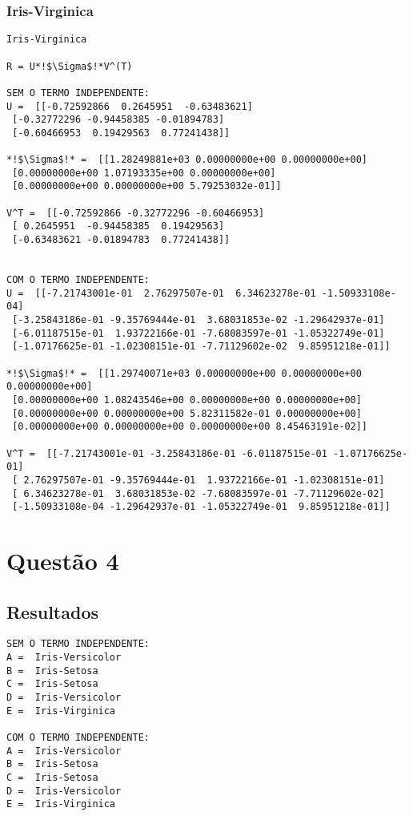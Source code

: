 \documentclass[a4paper,12pt,twoside]{article}
\begin{document}
\subsubsection{Iris-Virginica}
\begin{lstlisting}
Iris-Virginica

R = U*!$\Sigma$!*V^(T)

SEM O TERMO INDEPENDENTE: 
U =  [[-0.72592866  0.2645951  -0.63483621]
 [-0.32772296 -0.94458385 -0.01894783]
 [-0.60466953  0.19429563  0.77241438]]

*!$\Sigma$!* =  [[1.28249881e+03 0.00000000e+00 0.00000000e+00]
 [0.00000000e+00 1.07193335e+00 0.00000000e+00]
 [0.00000000e+00 0.00000000e+00 5.79253032e-01]]

V^T =  [[-0.72592866 -0.32772296 -0.60466953]
 [ 0.2645951  -0.94458385  0.19429563]
 [-0.63483621 -0.01894783  0.77241438]]


COM O TERMO INDEPENDENTE: 
U =  [[-7.21743001e-01  2.76297507e-01  6.34623278e-01 -1.50933108e-04]
 [-3.25843186e-01 -9.35769444e-01  3.68031853e-02 -1.29642937e-01]
 [-6.01187515e-01  1.93722166e-01 -7.68083597e-01 -1.05322749e-01]
 [-1.07176625e-01 -1.02308151e-01 -7.71129602e-02  9.85951218e-01]]

*!$\Sigma$!* =  [[1.29740071e+03 0.00000000e+00 0.00000000e+00 0.00000000e+00]
 [0.00000000e+00 1.08243546e+00 0.00000000e+00 0.00000000e+00]
 [0.00000000e+00 0.00000000e+00 5.82311582e-01 0.00000000e+00]
 [0.00000000e+00 0.00000000e+00 0.00000000e+00 8.45463191e-02]]

V^T =  [[-7.21743001e-01 -3.25843186e-01 -6.01187515e-01 -1.07176625e-01]
 [ 2.76297507e-01 -9.35769444e-01  1.93722166e-01 -1.02308151e-01]
 [ 6.34623278e-01  3.68031853e-02 -7.68083597e-01 -7.71129602e-02]
 [-1.50933108e-04 -1.29642937e-01 -1.05322749e-01  9.85951218e-01]]
\end{lstlisting}

\section{Questão 4}
\subsection{Resultados}
\begin{lstlisting}
SEM O TERMO INDEPENDENTE: 
A =  Iris-Versicolor
B =  Iris-Setosa
C =  Iris-Setosa
D =  Iris-Versicolor
E =  Iris-Virginica

COM O TERMO INDEPENDENTE: 
A =  Iris-Versicolor
B =  Iris-Setosa
C =  Iris-Setosa
D =  Iris-Versicolor
E =  Iris-Virginica
\end{lstlisting}
\end{document}
